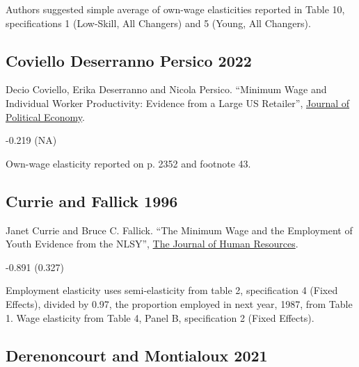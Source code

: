 \vspace{0.7em}

 Authors suggested simple average of own-wage elasticities reported in Table 10, specifications 1 (Low-Skill, All Changers) and 5 (Young, All Changers).

\subsection*{Coviello Deserranno Persico 2022}
\vspace{-0.7em}

\noindent Decio Coviello, Erika Deserranno and Nicola Persico. ``Minimum Wage and Individual Worker Productivity: Evidence from a Large US Retailer'', \href{https://doi.org/10.1086/720397}{Journal of Political Economy}.

\vspace{0.7em}

 -0.219 (NA)

\vspace{0.7em}

 Own-wage elasticity reported on p. 2352 and footnote 43.

\subsection*{Currie and Fallick 1996}
\vspace{-0.7em}

\noindent Janet Currie and Bruce C. Fallick. ``The Minimum Wage and the Employment of Youth Evidence from the NLSY'', \href{https://doi.org/10.2307/146069}{The Journal of Human Resources}.

\vspace{0.7em}

 -0.891 (0.327)

\vspace{0.7em}

 Employment elasticity uses semi-elasticity from table 2, specification 4 (Fixed Effects), divided by 0.97, the proportion employed in next year, 1987, from Table 1. Wage elasticity from Table 4, Panel B, specification 2 (Fixed Effects).

\subsection*{Derenoncourt and Montialoux 2021}
\vspace{-0.7em}

